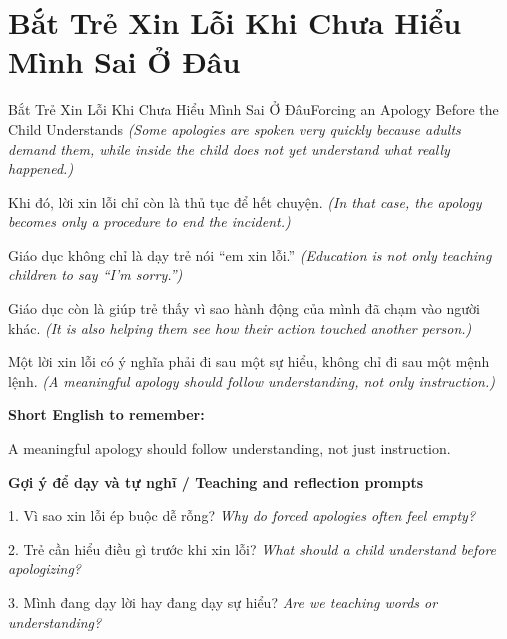 \section{Bắt Trẻ Xin Lỗi Khi Chưa Hiểu Mình Sai Ở Đâu}
\begin{truyen}{Bắt Trẻ Xin Lỗi Khi Chưa Hiểu Mình Sai Ở Đâu}{Forcing an Apology Before the Child Understands}
\textit{(Some apologies are spoken very quickly because adults demand them, while inside the child does not yet understand what really happened.)}

Khi đó, lời xin lỗi chỉ còn là thủ tục để hết chuyện.
\textit{(In that case, the apology becomes only a procedure to end the incident.)}

Giáo dục không chỉ là dạy trẻ nói “em xin lỗi.”
\textit{(Education is not only teaching children to say “I’m sorry.”)}

Giáo dục còn là giúp trẻ thấy vì sao hành động của mình đã chạm vào người khác.
\textit{(It is also helping them see how their action touched another person.)}

\end{truyen}

\begin{baihoc}
Một lời xin lỗi có ý nghĩa phải đi sau một sự hiểu, không chỉ đi sau một mệnh lệnh.
\textit{(A meaningful apology should follow understanding, not only instruction.)}
\end{baihoc}

\begin{ghinhoanh}
\textbf{Short English to remember:}

A meaningful apology should follow understanding, not just instruction.

\end{ghinhoanh}

\begin{tuhocnhanh}
\textbf{Gợi ý để dạy và tự nghĩ / Teaching and reflection prompts}

1. Vì sao xin lỗi ép buộc dễ rỗng? \textit{Why do forced apologies often feel empty?}

2. Trẻ cần hiểu điều gì trước khi xin lỗi? \textit{What should a child understand before apologizing?}

3. Mình đang dạy lời hay đang dạy sự hiểu? \textit{Are we teaching words or understanding?}
\end{tuhocnhanh}
